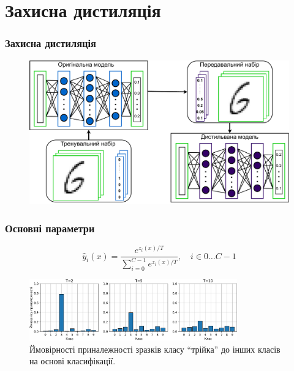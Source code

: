 \documentclass{beamer}
\numberwithin{equation}{section}
\begin{document}
	
	\section{Захисна дистиляція}
	\begin{frame}
		\frametitle{Захисна дистиляція}
	
		\begin{figure}[h]
			\centering
			\includegraphics[width=1\textwidth]{../images/diagrams-Distillation.pdf}
			
		\end{figure}
	\end{frame}

	\begin{frame}
		\frametitle{Основні параметри}
		
		\begin{equation}
			\label{softmax-t}
			\hat{y}_i(x)=\frac{e^{z_{i}(x) / T}}{\sum\limits_{i=0}^{C-1} e^{z_{i}(x) / T}}, \quad i \in 0 \dots C-1
		\end{equation}
		
		\begin{figure}[h]
			\centering
			\includegraphics[width=0.8\textwidth]{../images/TvsP.pdf}
			
			\caption{Ймовірності приналежності зразків класу ``трійка'' до інших класів на основі класифікації.}
		\end{figure}
	\end{frame}
\end{document}
